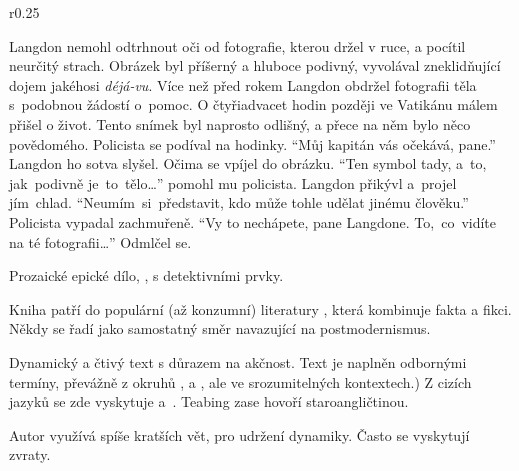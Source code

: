 \documentclass{extarticle} %
\begin{document}
\noindent\begin{wrapfigure}{r}{0.25\textwidth}
\tiny

\setlength{\parindent}{3pt}
Langdon nemohl odtrhnout oči od fotografie, kterou držel v ruce, a pocítil neurčitý strach.
Obrázek byl příšerný a hluboce podivný, vyvolával zneklidňující dojem jakéhosi \textit{déjá-vu}.
Více než před rokem Langdon obdržel fotografii těla s~podobnou žádostí o~pomoc.
O čtyřiadvacet hodin později ve Vatikánu málem přišel o život.
Tento snímek byl naprosto odlišný, a přece na něm bylo něco povědomého.
Policista se podíval na hodinky.
\enquote{Můj kapitán vás očekává, pane.}
Langdon ho sotva slyšel.
Očima se vpíjel do obrázku.
\enquote{Ten symbol tady, a~to, jak~podivně je~to~tělo…}  pomohl mu policista.
Langdon přikývl a~projel jím~chlad.
\enquote{Neumím~si~představit, kdo může tohle udělat jinému člověku.}
Policista vypadal zachmuřeně.
\enquote{Vy to nechápete, pane Langdone. To,~co~vidíte na té fotografii…} Odmlčel se.
\end{wrapfigure}


\noindent Prozaické epické dílo, ,
 s detektivními prvky.

\noindent Kniha patří do populární (až konzumní) literatury
, která kombinuje fakta a fikci.
Někdy se řadí jako samostatný směr navazující na postmodernismus.

\noindent Dynamický a čtivý text s důrazem na akčnost.
Text je naplněn odbornými termíny,
převážně z okruhů ,  a ,
ale ve srozumitelných kontextech.)
Z cizích jazyků se zde vyskytuje  a~.
Teabing zase hovoří staroangličtinou.



\noindent Autor využívá spíše kratších vět, pro udržení dynamiky.
Často se vyskytují zvraty.
\end{document}
